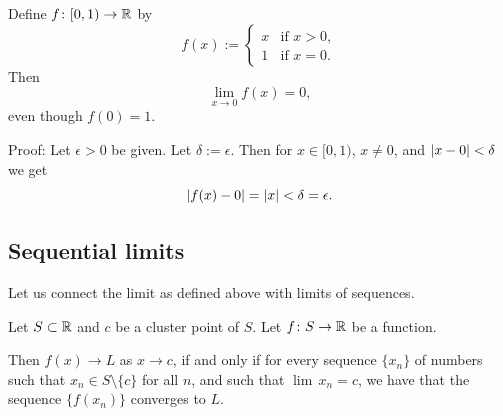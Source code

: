 \begin{example}
Define $f \colon [0,1) \to {\mathbb{R}}$ by
\begin{equation*}
f(x) := 
\begin{cases}
x & \text{if $x > 0$} , \\
1 & \text{if $x = 0$} .
\end{cases}
\end{equation*}
Then
\begin{equation*}
\lim_{x\to 0} f(x) = 0 ,
\end{equation*}
even though $f(0) = 1$.

Proof:  Let $\epsilon > 0$ be given.  Let $\delta := \epsilon$.
Then for $x \in [0,1)$, $x \not= 0$, and $\left\lvert {x-0} \right\rvert < \delta$ we get
\begin{equation*}
\left\lvert {f(x) - 0} \right\rvert = \left\lvert {x} \right\rvert < \delta = \epsilon .
\end{equation*}
\end{example}

\subsection{Sequential limits} \label{subseq:sequentiallimits}

Let us connect the limit as defined above with limits of sequences.

\begin{lemma}\label{seqflimit:lemma}
Let $S \subset {\mathbb{R}}$ and $c$ be a cluster point of $S$.  Let $f \colon S \to
{\mathbb{R}}$ be a function.

Then
$f(x) \to L$ as $x \to c$, if and only if for every sequence $\{ x_n \}$
of numbers such that $x_n \in S \setminus \{c\}$ for all $n$,
and such that $\lim\, x_n = c$,
we have that the sequence $\{ f(x_n) \}$ converges to $L$.
\end{lemma}

